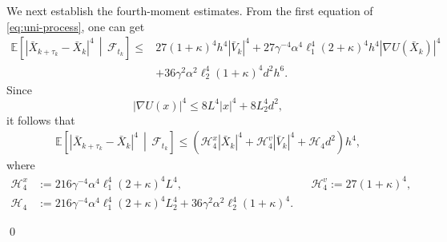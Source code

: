 \documentclass[12pt]{article}
\newenvironment{redtext}
  {\color{black}\ignorespaces}
  {\ignorespacesafterend}
\numberwithin{equation}{section}
\renewenvironment{proof}%
  {\begin{trivlist}%
   \item[]\ignorespaces}%
  {\qed\end{trivlist}}
\begin{document}
\begin{redtext}
\begin{proof}
We next establish the fourth-moment estimates. From
the first equation of \eqref{eq:uni-process}, one can get
\begin{align}
\mathbb E
\left[
\left|
\bar X_{k+\tau_k}-\bar X_k
\right|^4
\,\middle|\,
\mathcal F_{t_k}
\right]
\leq&
27(1+\kappa)^4h^4|\bar V_k|^4
+
27\gamma^{-4}\alpha^4\ell_1^4
(2+\kappa)^4h^4|\nabla U(\bar X_k)|^4
\nonumber\\
&+
36\gamma^2\alpha^2\ell_2^4
(1+\kappa)^4d^2h^6.
\end{align}
Since
\[
|\nabla U(x)|^4
\leq
8L^4|x|^4+8L_2^4d^2,
\]
it follows that
\begin{equation}
\label{eq:predictor-fourth-moment}
\begin{aligned}
\mathbb E
\left[
\left|
\bar X_{k+\tau_k}-\bar X_k
\right|^4
\,\middle|\,
\mathcal F_{t_k}
\right]\leq
\left(
\mathcal H_4^x|\bar X_k|^4
+
\mathcal H_4^v|\bar V_k|^4
+
\mathcal H_4 d^2
\right)h^4,
\end{aligned}
\end{equation}
where
\begin{equation}
\label{eq:E1-E3-fourth-moment}
\begin{aligned}
\mathcal H_4^x
&:=
216\gamma^{-4}\alpha^4\ell_1^4
(2+\kappa)^4L^4, 
&& 
\mathcal H_4^v
:=
27(1+\kappa)^4,\\
\mathcal H_4
&:=
216\gamma^{-4}\alpha^4\ell_1^4
(2+\kappa)^4L_2^4
+
36\gamma^2\alpha^2\ell_2^4(1+\kappa)^4.
\end{aligned}
\end{equation}


\end{proof}
\end{redtext}
\end{document}
